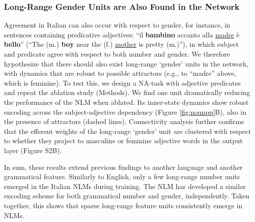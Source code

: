 \subsubsection{Long-Range Gender Units are Also Found in the Network }
Agreement in Italian can also occur with respect to gender, for instance, in sentences containing predicative adjectives: ``il \textbf{bambino} accanto alla \underline{madre} \`{e} \textbf{bello}'' (``The (m.) \textbf{boy} near the (f.) \underline{mother} is pretty (m.)''), in which subject and predicate agree with respect to both number and gender. We therefore hypothesize that there should also exist long-range `gender' units in the network, with dynamics that are robust to possible attractors (e.g., to ``madre'' above, which is feminine). 
To test this, we design a NA-task with adjective predicates and repeat the ablation study (Methods). 
We find one unit dramatically reducing the performance of the NLM when ablated. Its inner-state dynamics show robust encoding across the subject-adjective dependency (Figure \ref{fig:nounpp}B), also in the presence of attractors (dashed lines). Connectivity analysis further confirms that the efferent weights of the long-range `gender' unit are clustered with respect to whether they project to masculine or feminine adjective words in the output layer (Figure S2B).

\vspace{10pt}
In sum, these results extend previous findings to another language and another grammatical feature. Similarly to English, only a few long-range number units emerged in the Italian NLMs during training. The NLM has developed a similar encoding scheme for both grammatical number and gender, independently. Taken together, this shows that sparse long-range feature units consistently emerge in NLMs.



